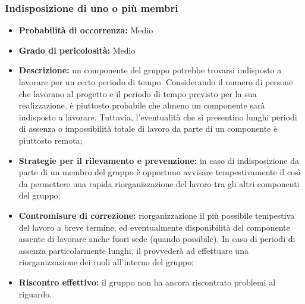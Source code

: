 \subsubsection{Indisposizione di uno o più membri}
\hypertarget{subsubsect:indisposizione}{}
\begin{itemize}
\item \textbf{Probabilità di occorrenza:} Medio
\item \textbf{Grado di pericolosità:} Medio

\item \textbf{Descrizione:} un componente del gruppo potrebbe trovarsi indisposto a lavorare per un certo periodo di tempo. Considerando il numero di persone che lavorano al progetto  e il periodo di tempo previsto per la sua realizzazione, è piuttosto probabile che almeno un componente sarà indisposto a lavorare. Tuttavia, l'eventualità che si presentino lunghi periodi di assenza o impossibilità totale di lavoro da parte di un componente è piuttosto remota;
\item \textbf{Strategie per il rilevamento e prevenzione:} in caso di indisposizione da parte di un membro del gruppo è opportuno avvisare tempestivamente il \ruoloResponsabile{}  così da permettere una rapida riorganizzazione del lavoro tra gli altri componenti del gruppo;

\item \textbf{Contromisure di correzione:} riorganizzazione il più possibile tempestiva del lavoro a breve termine, ed eventualmente disponibilità del componente assente di lavorare anche fuori sede (quando possibile). In caso di periodi di assenza particolarmente lunghi, il \ruoloResponsabile{} provvederà ad effettuare una riorganizzazione dei ruoli all'interno del gruppo;

\item \textbf{Riscontro effettivo:} il gruppo non ha ancora riscontrato problemi al riguardo.
\end{itemize}

